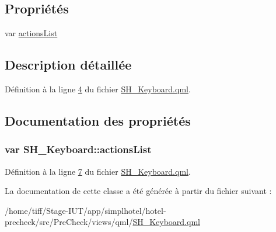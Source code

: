 \subsection*{Propriétés}
\begin{DoxyCompactItemize}
\item 
var \hyperlink{classSH__Keyboard_a0fafeb62ceee0f38c8d7d9d5919795e5}{actions\-List}
\end{DoxyCompactItemize}


\subsection{Description détaillée}


Définition à la ligne \hyperlink{SH__Keyboard_8qml_source_l00004}{4} du fichier \hyperlink{SH__Keyboard_8qml_source}{S\-H\-\_\-\-Keyboard.\-qml}.



\subsection{Documentation des propriétés}
\hypertarget{classSH__Keyboard_a0fafeb62ceee0f38c8d7d9d5919795e5}{
\subsubsection[{actions\-List}]{\setlength{\rightskip}{0pt plus 5cm}var S\-H\-\_\-\-Keyboard\-::actions\-List}}\label{classSH__Keyboard_a0fafeb62ceee0f38c8d7d9d5919795e5}


Définition à la ligne \hyperlink{SH__Keyboard_8qml_source_l00007}{7} du fichier \hyperlink{SH__Keyboard_8qml_source}{S\-H\-\_\-\-Keyboard.\-qml}.



La documentation de cette classe a été générée à partir du fichier suivant \-:\begin{DoxyCompactItemize}
\item 
/home/tiff/\-Stage-\/\-I\-U\-T/app/simplhotel/hotel-\/precheck/src/\-Pre\-Check/views/qml/\hyperlink{SH__Keyboard_8qml}{S\-H\-\_\-\-Keyboard.\-qml}\end{DoxyCompactItemize}
